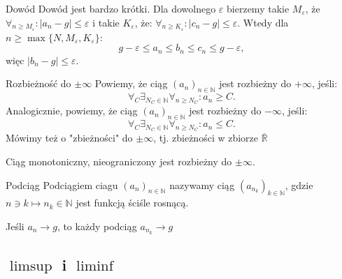 \documentclass{article}
\numberwithin{defi}{section}
\numberwithin{defi}{section}
\newcommand{\R}{\mathbb{R}}
\newcommand{\N}{\mathbb{N}}
\newcommand{\oo}{\infty}
\providecommand{\eps}{\varepsilon}
\newcommand{\ciag}[1]{(#1_{n})_{n \in \N}}
\begin{document}
\begin{dow}{Dowód}
    Dowód jest bardzo krótki. Dla dowolnego $\eps$ bierzemy takie $M_{\eps}$, że $\forall_{n \geqslant M_{\eps}}: |a_n - g| \leqslant \eps $ i takie $K_{\eps}$, że: $\forall_{n \geqslant K_{\eps}}: |c_n - g| \leqslant \eps $. Wtedy dla $n \geqslant \max\{N, M_\eps, K_\eps \}$: \begin{equation}
        g - \eps \leqslant a_n \leqslant b_n \leqslant c_n \leqslant g - \eps,
    \end{equation}
    więc $|b_n - g| \leqslant \eps$.
\end{dow}



\begin{defr}{Rozbieżność do $\pm \oo$}
    Powiemy, że ciąg $\ciag{a}$ jest rozbieżny do $+\oo$, jeśli: \begin{equation}
        \forall_C \exists_{N_C \in \N} \forall_{n \geqslant N_C}: a_n \geqslant C.
    \end{equation}
    Analogicznie, powiemy, że ciąg $\ciag{a}$ jest rozbieżny do $-\oo$, jeśli: \begin{equation}
        \forall_C \exists_{N_C \in \N} \forall_{n \geqslant N_C}: a_n \leqslant C.
    \end{equation}
    Mówimy też o "zbieżności" do $\pm \oo$, tj. zbieżności w zbiorze $\overline{\R}$
\end{defr}

\begin{obs}{}
    Ciąg monotoniczny, nieograniczony jest rozbieżny do $\pm \oo$.
\end{obs}

\begin{defr}{Podciąg}
    Podciągiem ciagu $\ciag{a}$ nazywamy ciąg $(a_{n_k})_{k \in \N}$, gdzie $n \ni k \mapsto n_k \in \N$ jest funkcją ściśle rosnącą.
\end{defr}


\begin{obs}{}
    Jeśli $a_n \to g$, to każdy podciąg $a_{n_k} \to g$
\end{obs}





\subsection{$\limsup$ i $\liminf$}
\end{document}
